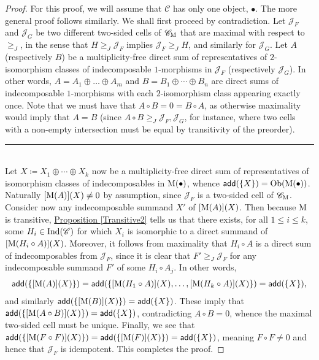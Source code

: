 \noindent\begin{proof} For this proof, we will assume that $\mathscr{C}$ has only one object, $\bullet$. The more general proof follows similarly. We shall first proceed by contradiction. Let $\mathcal{J}_F$ and $\mathcal{J}_G$ be two different two-sided cells of $\mathscr{C}_\textup{M}$ that are maximal with respect to $\geq_{J}$, in the sense that $H \geq_{J} \mathcal{J}_F$ implies $\mathcal{J}_F \geq_{J} H$, and similarly for $\mathcal{J}_G$. Let $A$ (respectively $B$) be a multiplicity-free direct sum of representatives of $2$-isomorphism classes of indecomposable $1$-morphisms in $\mathcal{J}_F$ (respectively $\mathcal{J}_G$). In other words, $A = A_1 \oplus \dots \oplus A_m$ and $B = B_1 \oplus \cdots \oplus B_n$ are direct sums of indecomposable $1$-morphisms with each $2$-isomorphism class appearing exactly once. Note that we must have that $A \circ B = 0 = B \circ A$, as otherwise maximality would imply that $A = B$ (since $A \circ B \geq_{J} \mathcal{J}_F, \mathcal{J}_G$, for instance, where two cells with a non-empty intersection must be equal by transitivity of the preorder).\\[-1.5\baselineskip]
\begin{center}
\rule{0.5\linewidth}{1pt}
\end{center}
\noindent\\[-\baselineskip]
\noindent Let $X \coloneqq X_1 \oplus \cdots \oplus X_k$ now be a multiplicity-free direct sum of representatives of isomorphism classes of indecomposables in $\textup{M}({\bullet})$, whence $\textsf{add}(\{X\}) = \textup{Ob}(\textup{M}({\bullet}))$. Naturally $[\textup{M}(A)](X) \neq 0$ by assumption, since $\mathcal{J}_F$ is a two-sided cell of $\mathscr{C}_\textup{M}$. Consider now any indecomposable summand $X'$ of $[\textup{M}(A)](X)$. Then because $\textup{M}$ is transitive, \hyperref[Transitive2]{Proposition \ref*{Transitive2}} tells us that there exists, for all $1 \leq i \leq k$, some $H_i \in \textup{Ind}(\mathscr{C})$ for which $X_i$ is isomorphic to a direct summand of $[\textup{M}(H_i \circ A)](X)$. Moreover, it follows from maximality that $H_i \circ A$ is a direct sum of indecomposables from $\mathcal{J}_F$, since it is clear that $F' \geq_{J} \mathcal{J}_F$ for any indecomposable summand $F'$ of some $H_i \circ A_j$. In other words,
\begin{align*}
\begin{split}
\textsf{add}(\{[\textup{M}(A)](X)\}) = \textsf{add}(\{[\textup{M}(H_1 \circ A)](X), \dots, [\textup{M}(H_k \circ A)](X)\}) = \textsf{add}(\{X\}),
\end{split}
\end{align*}
\noindent and similarly $\textsf{add}(\{[\textup{M}(B)](X)\}) = \textsf{add}(\{X\})$. These imply that $\textsf{add}(\{[\textup{M}(A \circ B)](X)\}) = \textsf{add}(\{X\})$, contradicting $A \circ B = 0$, whence the maximal two-sided cell must be unique. Finally, we see that $\textsf{add}(\{[\textup{M}(F \circ F)](X)\}) = \textsf{add}(\{[\textup{M}(F)](X)\}) = \textsf{add}(\{X\})$, meaning $F \circ F \neq 0$ and hence that $\mathcal{J}_F$ is idempotent. This completes the proof.
\end{proof}
\newpage

